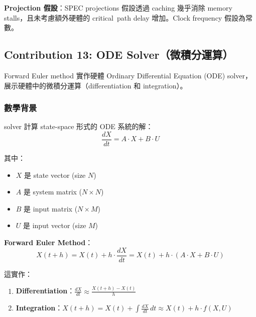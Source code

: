 \documentclass[journal]{IEEEtran}
\newcommand{\tagit}[1]{\textit{#1}}
\newcommand{\Goal}{\tagit{目標：}}
\begin{document}
\textbf{Projection 假設}：SPEC projections 假設透過 caching 幾乎消除 memory stalls，且未考慮額外硬體的 critical~path delay 增加。Clock frequency 假設為常數。

\subsection{Contribution 13: ODE Solver（微積分運算）}

 Forward Euler method 實作硬體 Ordinary Differential Equation (ODE) solver，展示硬體中的微積分運算（differentiation 和 integration）。

\subsubsection{數學背景}
solver 計算 state-space 形式的 ODE 系統的解：
\begin{equation}
\frac{dX}{dt} = A \cdot X + B \cdot U
\label{eq:ode}
\end{equation}

其中：
\begin{itemize}
    \item $X$ 是 state vector (size $N$)
    \item $A$ 是 system matrix ($N \times N$)
    \item $B$ 是 input matrix ($N \times M$)
    \item $U$ 是 input vector (size $M$)
\end{itemize}

\textbf{Forward Euler Method}：
\begin{equation}
X(t+h) = X(t) + h \cdot \frac{dX}{dt} = X(t) + h \cdot (A \cdot X + B \cdot U)
\label{eq:euler}
\end{equation}

這實作：
\begin{enumerate}
    \item \textbf{Differentiation}：$\frac{dX}{dt} \approx \frac{X(t+h) - X(t)}{h}$
    \item \textbf{Integration}：$X(t+h) = X(t) + \int \frac{dX}{dt} \, dt \approx X(t) + h \cdot f(X, U)$
\end{enumerate}
\end{document}
